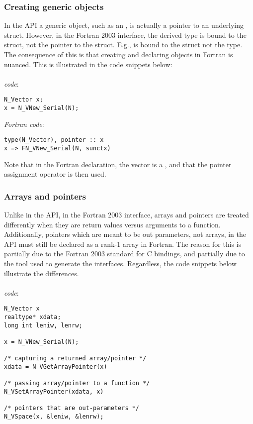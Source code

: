 \subsubsection{Creating generic {\sundials} objects}

In the {\CC} API a generic {\sundials} object, such as an , is actually
a pointer to an underlying {\CC} struct. However, in the Fortran 2003 interface,
the derived type is bound to the {\CC} struct, not the pointer to the struct. E.g.,
 is bound to the {\CC} struct  not the
 type. The consequence of this is that creating and declaring {\sundials}
objects in Fortran is nuanced. This is illustrated in the code snippets below:
\\
\\
\noindent \emph{{\CC} code}:
\begin{verbatim}
N_Vector x;
x = N_VNew_Serial(N);
\end{verbatim}

\noindent \emph{Fortran code}:
\begin{verbatim}
type(N_Vector), pointer :: x
x => FN_VNew_Serial(N, sunctx)
\end{verbatim}

Note that in the Fortran declaration, the vector is a , and
that the pointer assignment operator is then used.

\subsubsection{Arrays and pointers}

Unlike in the {\CC} API, in the Fortran 2003 interface, arrays and pointers are
treated differently when they are return values versus arguments to a function.
Additionally, pointers which are meant to be out parameters, not arrays,
in the {\CC} API must still be declared as a rank-1 array in Fortran.
The reason for this is partially due to the Fortran 2003 standard for C bindings,
and partially due to the tool used to generate the interfaces. Regardless, the
code snippets below illustrate the differences.
\\
\\
\noindent \emph{{\CC} code}:
\begin{verbatim}
N_Vector x
realtype* xdata;
long int leniw, lenrw;

x = N_VNew_Serial(N);

/* capturing a returned array/pointer */
xdata = N_VGetArrayPointer(x)

/* passing array/pointer to a function */
N_VSetArrayPointer(xdata, x)

/* pointers that are out-parameters */
N_VSpace(x, &leniw, &lenrw);
\end{verbatim}

